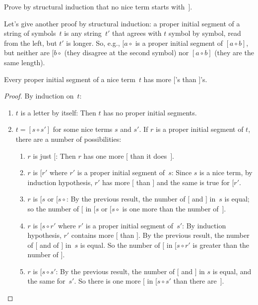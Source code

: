 \documentclass[../../../include/open-logic-section]{subfiles}
\begin{document}
  
\begin{prob}
  Prove by structural induction that no nice term starts with~$]$.
\end{prob}

Let's give another proof by structural induction: a proper initial
segment of a string of symbols~$t$ is any string~$t'$ that agrees with
$t$ symbol by symbol, read from the left, but $t'$ is longer. So,
e.g., $[a \circ {}$ is a proper initial segment of $[a \circ b]$, but
neither are $[b \circ {}$ (they disagree at the second symbol) nor $[a
\circ b]$ (they are the same length).

\begin{prop}
  Every proper initial segment of a nice term~$t$ has more $[$'s than
    $]$'s.
\end{prop}

\begin{proof}
  By induction on~$t$:
  \begin{enumerate}
  \item $t$ is a letter by itself: Then $t$ has no proper initial segments.
  \item $t = [s \circ s']$ for some nice terms $s$ and $s'$. If $r$ is
    a proper initial segment of $t$, there are a number of
    possibilities:
    \begin{enumerate}
    \item $r$ is just $[$: Then $r$ has one more $[$ than it does~$]$.
    \item $r$ is $[r'$ where $r'$ is a proper initial segment
      of~$s$: Since $s$ is a nice term, by induction hypothesis, $r'$
      has more $[$ than $]$ and the same is true for $[r'$.
    \item $r$ is $[s$ or $[s \circ {}$: By the previous result, the
      number of $[$ and $]$ in~$s$ is equal; so the number of $[$
      in $[s$ or $[s \circ {}$ is one more than the number of~$]$.
    \item $r$ is $[s \circ r'$ where $r'$ is a proper initial segment
      of~$s'$:  By induction hypothesis, $r'$ contains more $[$ than
      $]$. By the previous result, the number of $[$ and of
      $]$ in~$s$ is equal. So the number of $[$ in $[s \circ r'$
      is greater than the number of $]$.
    \item $r$ is $[s \circ s'$: By the previous result, the number of
      $[$ and $]$ in $s$ is equal, and the same for~$s'$. So there
      is one more $[$ in $[s \circ s'$ than there are~$]$.
    \end{enumerate}
  \end{enumerate}
\end{proof}
\end{document}
